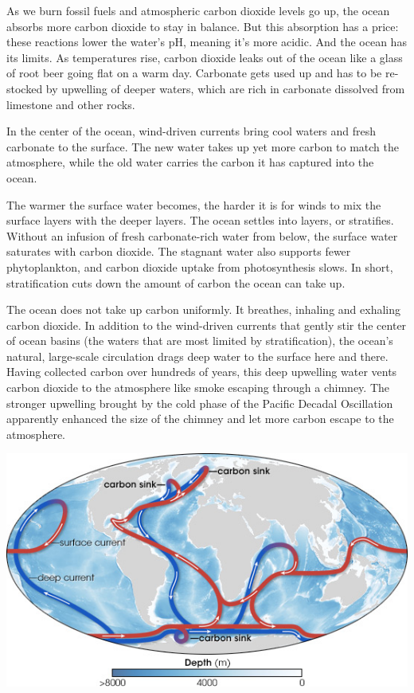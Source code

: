 \documentclass[
]{book}
\begin{document}
As we burn fossil fuels and atmospheric carbon dioxide levels go up, the ocean absorbs more carbon dioxide to stay in balance. But this absorption has a price: these reactions lower the water's pH, meaning it's more acidic. And the ocean has its limits. As temperatures rise, carbon dioxide leaks out of the ocean like a glass of root beer going flat on a warm day. Carbonate gets used up and has to be re-stocked by upwelling of deeper waters, which are rich in carbonate dissolved from limestone and other rocks.

In the center of the ocean, wind-driven currents bring cool waters and fresh carbonate to the surface. The new water takes up yet more carbon to match the atmosphere, while the old water carries the carbon it has captured into the ocean.

The warmer the surface water becomes, the harder it is for winds to mix the surface layers with the deeper layers. The ocean settles into layers, or stratifies. Without an infusion of fresh carbonate-rich water from below, the surface water saturates with carbon dioxide. The stagnant water also supports fewer phytoplankton, and carbon dioxide uptake from photosynthesis slows. In short, stratification cuts down the amount of carbon the ocean can take up.

The ocean does not take up carbon uniformly. It breathes, inhaling and exhaling carbon dioxide. In addition to the wind-driven currents that gently stir the center of ocean basins (the waters that are most limited by stratification), the ocean's natural, large-scale circulation drags deep water to the surface here and there. Having collected carbon over hundreds of years, this deep upwelling water vents carbon dioxide to the atmosphere like smoke escaping through a chimney. The stronger upwelling brought by the cold phase of the Pacific Decadal Oscillation apparently enhanced the size of the chimney and let more carbon escape to the atmosphere.

\includegraphics{fig/ocean_circulation_carbon_sinks.jpg}
\end{document}
